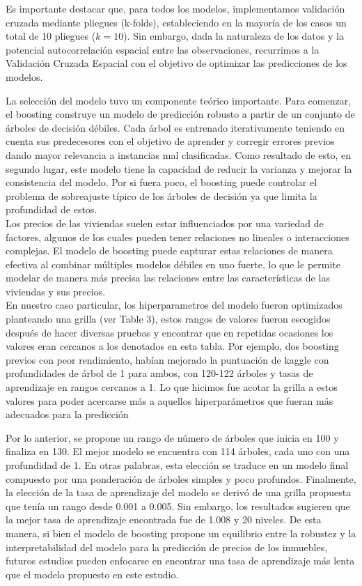 \documentclass[12pt]{article}
\begin{document}
Es importante destacar que, para todos los modelos, implementamos validación cruzada mediante pliegues (k-folds), estableciendo en la mayoría de los casos un total de 10 pliegues ($k=10$). Sin embargo, dada la naturaleza de los datos y la potencial autocorrelación espacial entre las observaciones, recurrimos a la Validación Cruzada Espacial con el objetivo de optimizar las predicciones de los modelos.

La selección del modelo tuvo un componente teórico importante. Para comenzar, el boosting construye un modelo de predicción robusto a partir de un conjunto de árboles de decisión débiles. Cada árbol es entrenado iterativamente teniendo en cuenta sus predecesores con el objetivo de aprender y corregir errores previos dando mayor relevancia a instancias mal clasificadas. Como resultado de esto, en segundo lugar, este modelo tiene la capacidad de reducir la varianza y mejorar la consistencia del modelo. Por si fuera poco, el boosting puede controlar el problema de sobreajuste típico de los árboles de decisión ya que limita la profundidad de estos.\\

 Los precios de las viviendas suelen estar influenciados por una variedad de factores, algunos de los cuales pueden tener relaciones no lineales o interacciones complejas. El modelo de boosting puede capturar estas relaciones de manera efectiva al combinar múltiples modelos débiles en uno fuerte, lo que le permite modelar de manera más precisa las relaciones entre las características de las viviendas y sus precios. \\ 
 
En nuestro caso particular, los hiperparametros del modelo fueron optimizados planteando una grilla (ver Table 3), estos rangos de valores fueron escogidos después de hacer diversas pruebas y encontrar que en repetidas ocasiones los valores eran cercanos a los denotados en esta tabla. Por ejemplo, dos boosting previos con peor rendimiento, habían mejorado la puntuación de kaggle con profundidades de árbol de 1 para ambos, con 120-122 árboles y tasas de aprendizaje en rangos cercanos a 1. Lo que hicimos fue acotar la grilla a estos valores para poder acercarse más a aquellos hiperparámetros que fueran más adecuados para la predicción 

Por lo anterior, se propone un rango de número de árboles que inicia en 100 y finaliza en 130. El mejor modelo se encuentra con 114 árboles, cada uno con una profundidad de 1. En otras palabras, esta elección se traduce en un modelo final compuesto por una ponderación de árboles simples y poco profundos. Finalmente, la elección de la tasa de aprendizaje del modelo se derivó de una grilla propuesta que tenía un rango desde 0.001 a 0.005. Sin embargo, los resultados sugieren que la mejor tasa de aprendizaje encontrada fue de 1.008 y 20 niveles. De esta manera, si bien el modelo de boosting propone un equilibrio entre la robustez y la interpretabilidad del modelo para la predicción de precios de los inmuebles, futuros estudios pueden enfocarse en encontrar una tasa de aprendizaje más lenta que el modelo propuesto en este estudio.\\
\end{document}
